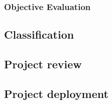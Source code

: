 \subsubsection*{Objective Evaluation}

\subsection*{Classification}

\subsection*{Project review}

\subsection*{Project deployment}


